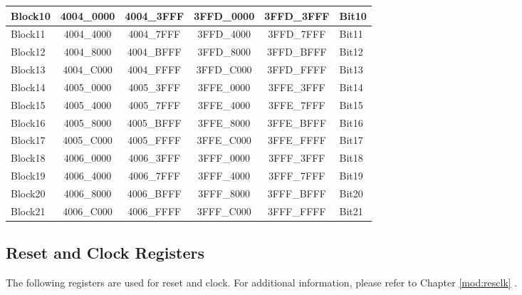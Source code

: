 \documentclass[main\_\_EN.tex]{subfiles}
\begin{document}
\begin{longtable}[c]{|l|c|c|c|c|l|}
Block10  & \hexprefix{}4004\_0000    & \hexprefix{}4004\_3FFF     & \hexprefix{}3FFD\_0000    & \hexprefix{}3FFD\_3FFF     & Bit10 \\\hline
Block11  & \hexprefix{}4004\_4000    & \hexprefix{}4004\_7FFF     & \hexprefix{}3FFD\_4000    & \hexprefix{}3FFD\_7FFF     & Bit11 \\\hline
Block12  & \hexprefix{}4004\_8000    & \hexprefix{}4004\_BFFF     & \hexprefix{}3FFD\_8000    & \hexprefix{}3FFD\_BFFF     & Bit12 \\\hline
Block13  & \hexprefix{}4004\_C000    & \hexprefix{}4004\_FFFF     & \hexprefix{}3FFD\_C000    & \hexprefix{}3FFD\_FFFF     & Bit13 \\\hline

Block14  & \hexprefix{}4005\_0000    & \hexprefix{}4005\_3FFF     & \hexprefix{}3FFE\_0000    & \hexprefix{}3FFE\_3FFF     & Bit14 \\\hline
Block15  & \hexprefix{}4005\_4000    & \hexprefix{}4005\_7FFF     & \hexprefix{}3FFE\_4000    & \hexprefix{}3FFE\_7FFF     & Bit15 \\\hline
Block16  & \hexprefix{}4005\_8000    & \hexprefix{}4005\_BFFF     & \hexprefix{}3FFE\_8000    & \hexprefix{}3FFE\_BFFF     & Bit16 \\\hline
Block17  & \hexprefix{}4005\_C000    & \hexprefix{}4005\_FFFF     & \hexprefix{}3FFE\_C000    & \hexprefix{}3FFE\_FFFF     & Bit17 \\\hline

Block18  & \hexprefix{}4006\_0000    & \hexprefix{}4006\_3FFF     & \hexprefix{}3FFF\_0000    & \hexprefix{}3FFF\_3FFF     & Bit18 \\\hline
Block19  & \hexprefix{}4006\_4000    & \hexprefix{}4006\_7FFF     & \hexprefix{}3FFF\_4000    & \hexprefix{}3FFF\_7FFF     & Bit19 \\\hline
Block20  & \hexprefix{}4006\_8000    & \hexprefix{}4006\_BFFF     & \hexprefix{}3FFF\_8000    & \hexprefix{}3FFF\_BFFF     & Bit20 \\\hline
Block21  & \hexprefix{}4006\_C000    & \hexprefix{}4006\_FFFF     & \hexprefix{}3FFF\_C000    & \hexprefix{}3FFF\_FFFF     & Bit21 \\\hline
\end{longtable}


\subsection{Reset and Clock Registers} \label{sec:peri-clock-gating-reset}
The following registers are used for reset and clock. For additional information, please refer to Chapter \ref{mod:resclk} \textit{}.
\end{document}
